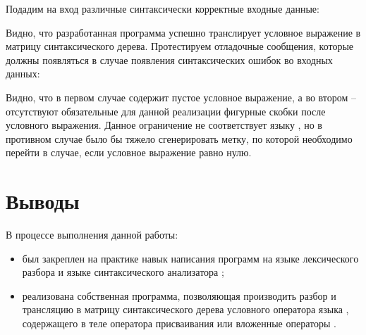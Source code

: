 Подадим на вход различные синтаксически корректные входные данные:




Видно, что разработанная программа успешно транслирует условное выражение в матрицу синтаксического дерева. Протестируем отладочные сообщения, которые должны появляться в случае появления синтаксических ошибок во входных данных:



Видно, что в первом случае  содержит пустое условное выражение, а во втором -- отсутствуют обязательные для данной реализации фигурные скобки после условного выражения. Данное ограничение не соответствует языку , но в противном случае было бы тяжело сгенерировать метку, по которой необходимо перейти в случае, если условное выражение равно нулю.

\newpage

\section{Выводы}

В процессе выполнения данной работы:

\begin{itemize}
	\item был закреплен на практике навык написания программ на языке лексического разбора  и языке синтаксического анализатора ;
	\item реализована собственная программа, позволяющая производить разбор и трансляцию в матрицу синтаксического дерева условного оператора  языка , содержащего в теле оператора присваивания или вложенные операторы .
\end{itemize}


